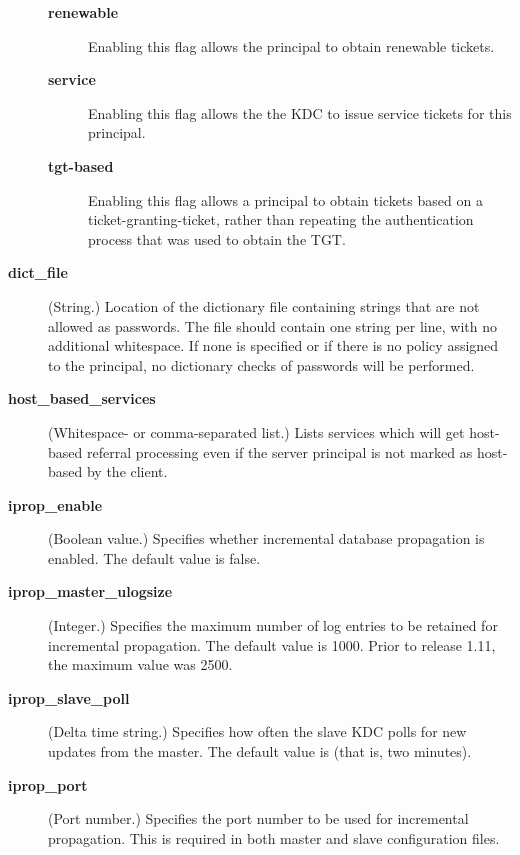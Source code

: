 \documentclass[letterpaper,10pt,english]{sphinxmanual}
\begin{document}
\begin{description}
\begin{description}
\item[{\textbf{renewable}}] \leavevmode
Enabling this flag allows the principal to obtain renewable
tickets.

\item[{\textbf{service}}] \leavevmode
Enabling this flag allows the the KDC to issue service tickets
for this principal.

\item[{\textbf{tgt-based}}] \leavevmode
Enabling this flag allows a principal to obtain tickets based
on a ticket-granting-ticket, rather than repeating the
authentication process that was used to obtain the TGT.

\end{description}

\item[{\textbf{dict\_file}}] \leavevmode
(String.)  Location of the dictionary file containing strings that
are not allowed as passwords.  The file should contain one string
per line, with no additional whitespace.  If none is specified or
if there is no policy assigned to the principal, no dictionary
checks of passwords will be performed.

\item[{\textbf{host\_based\_services}}] \leavevmode
(Whitespace- or comma-separated list.)  Lists services which will
get host-based referral processing even if the server principal is
not marked as host-based by the client.

\item[{\textbf{iprop\_enable}}] \leavevmode
(Boolean value.)  Specifies whether incremental database
propagation is enabled.  The default value is false.

\item[{\textbf{iprop\_master\_ulogsize}}] \leavevmode
(Integer.)  Specifies the maximum number of log entries to be
retained for incremental propagation.  The default value is 1000.
Prior to release 1.11, the maximum value was 2500.

\item[{\textbf{iprop\_slave\_poll}}] \leavevmode
(Delta time string.)  Specifies how often the slave KDC polls for
new updates from the master.  The default value is  (that
is, two minutes).

\item[{\textbf{iprop\_port}}] \leavevmode
(Port number.)  Specifies the port number to be used for
incremental propagation.  This is required in both master and
slave configuration files.


\end{description}
\end{document}
